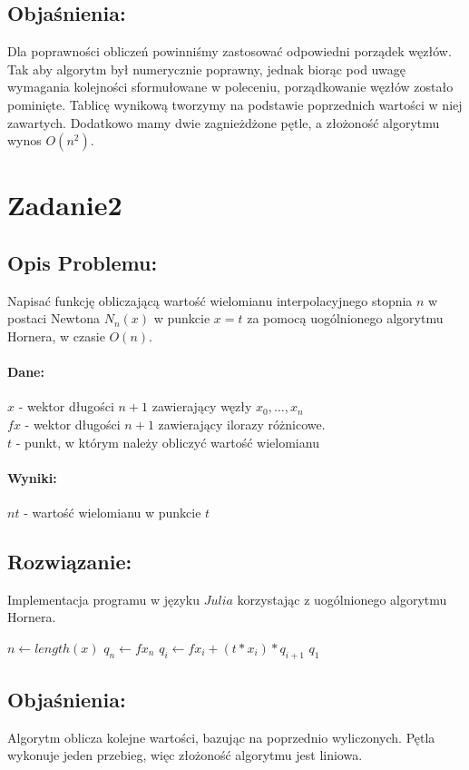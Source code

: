 \documentclass{article}
\begin{document}
\subsection{Objaśnienia:}
Dla poprawności obliczeń powinniśmy zastosować odpowiedni porządek węzłów. Tak aby algorytm był numerycznie poprawny, jednak biorąc pod uwagę wymagania kolejności sformułowane w poleceniu, porządkowanie węzłów zostało pominięte. Tablicę wynikową tworzymy na podstawie poprzednich wartości w niej zawartych. Dodatkowo mamy dwie zagnieżdżone pętle, a złożoność algorytmu wynos $O(n^2)$.

\newpage
\section{Zadanie2}
\subsection{Opis Problemu:}
Napisać funkcję obliczającą wartość wielomianu interpolacyjnego stopnia $n$ w postaci Newtona $N_n(x)$ w punkcie $x=t$ za pomocą uogólnionego algorytmu Hornera, w czasie $O(n)$.
\paragraph{Dane:}
\indent$x$ - wektor długości $n+1$  zawierający węzły $x_0, \ldots, x_n$\\
\indent$fx$ - wektor długości $n+1$ zawierający ilorazy różnicowe.\\
\indent$t$ - punkt, w którym należy obliczyć wartość wielomianu
\paragraph{Wyniki:}
\indent$nt$ - wartość wielomianu w punkcie $t$
\subsection{Rozwiązanie:}
Implementacja programu w języku $Julia$ korzystając z uogólnionego algorytmu Hornera.
\begin{algorithm}[h!]
	\caption{$warNewton(x, fx, t)$}
	\begin{algorithmic}
		\STATE $n\leftarrow length(x)$
		\STATE $q_n \leftarrow fx_n$
		\STATE $q_i \leftarrow fx_i +(t * x_i) * q_{i+1}$
		\ENDFOR
		\RETURN $q_1$
	\end{algorithmic}
\end{algorithm}
\subsection{Objaśnienia:}
Algorytm oblicza kolejne wartości, bazując na poprzednio wyliczonych. Pętla wykonuje jeden przebieg, więc złożoność algorytmu jest liniowa. 
\newpage
\end{document}
